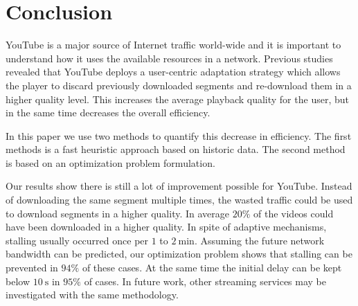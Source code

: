 
\section{Conclusion}
\label{sec:conclusion}

YouTube is a major source of Internet traffic world-wide and it is important to understand how it uses the available resources in a network.
Previous studies revealed that YouTube deploys a user-centric adaptation strategy which allows the player to discard previously downloaded segments and re-download them in a higher quality level.
This increases the average playback quality for the user, but in the same time decreases the overall efficiency.

In this paper we use two methods to quantify this decrease in efficiency.
The first methods is a fast heuristic approach based on historic data.
The second method is based on an optimization problem formulation.

Our results show there is still a lot of improvement possible for YouTube. Instead of downloading the same segment multiple times, the wasted traffic could be used to download segments in a higher quality. In average $20\%$ of the videos could have been downloaded in a higher quality. In spite of adaptive mechanisms, stalling usually occurred once per $1$ to $\SI{2}{\minute}$. Assuming the future network bandwidth can be predicted, our optimization problem shows that stalling can be prevented in $94\%$ of these cases. At the same time the initial delay can be kept below $\SI{10}{\second}$ in $95\%$ of cases. In future work, other streaming services may be investigated with the same methodology.
